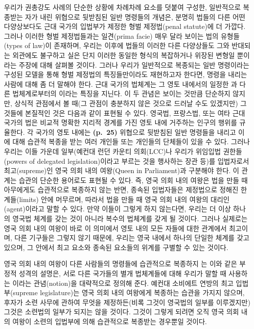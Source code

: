 우리가 권총강도 사례의 단순한 상황에 차례차례 요소를 덧붙여 구성한,
일반적으로 복종받는 자가 내린 위협으로 뒷받침된 일반 명령들의 개념은,
분명히 법들의 다른 어떤 다양상보다도 근대 국가의 입법부가 제정한 형벌
제정법(penal statute)에 더 가깝다. 그러나 이러한 형벌 제정법들과는
일견(prima facie) 매우 달라 보이는 법의 유형들(types of law)이 존재하며,
우리는 이후에 법들의 이러한 다른 다양상들도 그와 반대되는 외관에도
불구하고 실은 단지 이러한 동일한 형식의 복잡하거나 위장된 변형일
뿐이라는 주장에 대해 살펴볼 것이다. 그러나 우리가 일반적으로 복종되는
일반 명령이라는 구성된 모델을 통해 형벌 제정법의 특징들만이라도
재현하고자 한다면, 명령을 내리는 사람에 대해 좀 더 말해야 한다. 근대
국가의 법체계는 그 영토 내에서의 일정한 과 다른
법체계로부터의 이라는 특징을 지닌다. 이 두
관념은 보이는 것만큼 단순하지 않지만, 상식적 관점에서 볼 때(그 관점이
충분하지 않은 것으로 드러날 수도 있겠지만) 그것들에 본질적인 것은 다음과
같이 표현될 수 있다. 영국법, 프랑스법, 또는 여타 근대 국가의 법은 비교적
명확한 지리적 경계를 가진 영토 내에 거주하는 인구의 행위를 규율한다. 각
국가의 영토 내에는 \textbf{(p.~25)} 위협으로 뒷받침된 일반 명령들을
내리고 이에 대해 습관적 복종을 받는 여러 개인들 또는 개인들의 단체들이
있을 수 있다. 그러나 우리는 이들 가운데 일부(예컨대 런던 카운티
의회(LCC)나 우리가 위임입법 권한들(powers of delegated
legislation)이라고 부르는 것을 행사하는 장관 등)를
 입법자로서 최고(supreme)인 영국 의회 내의
여왕(Queen in Parliament)과 구분해야 한다. 이 관계는 습관의 단순한
용어로도 표현될 수 있다. 즉, 영국 의회 내의 여왕은 법을 만들 때
아무에게도 습관적으로 복종하지 않는 반면, 종속된 입법자들은 제정법으로
정해진 한계들(limits) 안에 머무르며, 따라서 법을 만들 때 영국 의회 내의
여왕의 대리인(agent)이라고 말할 수 있다. 만약 이들이 그렇게 하지
않는다면, 우리는 더 이상 하나의 영국법 체계를 갖는 것이 아니라 복수의
법체계를 갖게 될 것이다. 그러나 실제로는 영국 의회 내의 여왕이 바로 이
의미에서 영토 내의 모든 자들에 대한 관계에서 최고이며, 다른 기구들은
그렇지 않기 때문에, 우리는 영국 내에서 하나의 단일한 체계를 갖고 있으며,
그 안에서 최고 요소와 종속된 요소들의 위계를 구별할 수 있는 것이다.

영국 의회 내의 여왕이 다른 사람들의 명령들에 습관적으로 복종하지
는 이와 같은 부정적 성격의 설명은, 서로 다른 국가들의
별개 법체계들에 대해 우리가 말할 때 사용하는
이라는 관념(notion)을 대략적으로 정의해 준다.
예컨대 소비에트 연방의 최고 입법부(supreme legislature)는 영국 의회 내의
여왕에게 복종하는 습관을 가지지 않으며, 후자가 소련 사무에 관하여 무엇을
제정하든(비록 그것이 영국법의 일부를 이루겠지만) 그것은 소련법의 일부가
되지는 않을 것이다. 그것이 그렇게 되려면 오직 영국 의회 내의 여왕이
소련의 입법부에 의해 습관적으로 복종받는 경우뿐일 것이다.

